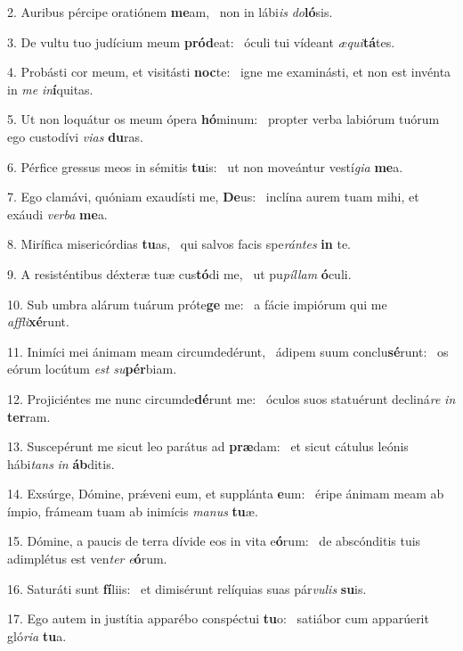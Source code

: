 2. Auribus pércipe oratiónem \textbf{me}am, \ast\  non in lábi\textit{is} \textit{do}\textbf{ló}sis.\

3. De vultu tuo judícium meum \textbf{pród}eat: \ast\  óculi tui vídeant \textit{æ}\textit{qui}\textbf{tá}tes.\

4. Probásti cor meum, et visitásti \textbf{noc}te: \ast\  igne me examinásti, et non est invénta in \textit{me} \textit{in}\textbf{í}quitas.\

5. Ut non loquátur os meum ópera \textbf{hó}minum: \ast\  propter verba labiórum tuórum ego custodívi \textit{vi}\textit{as} \textbf{du}ras.\

6. Pérfice gressus meos in sémitis \textbf{tu}is: \ast\  ut non moveántur vestí\textit{gi}\textit{a} \textbf{me}a.\

7. Ego clamávi, quóniam exaudísti me, \textbf{De}us: \ast\  inclína aurem tuam mihi, et exáudi \textit{ver}\textit{ba} \textbf{me}a.\

8. Mirífica misericórdias \textbf{tu}as, \ast\  qui salvos facis spe\textit{rán}\textit{tes} \textbf{in} te.\

9. A resisténtibus déxteræ tuæ cus\textbf{tó}di me, \ast\  ut pu\textit{píl}\textit{lam} \textbf{ó}culi.\

10. Sub umbra alárum tuárum próte\textbf{ge} me: \ast\  a fácie impiórum qui me \textit{af}\textit{fli}\textbf{xé}runt.\

11. Inimíci mei ánimam meam circumdedérunt, \dag\  ádipem suum conclu\textbf{sé}runt: \ast\  os eórum locútum \textit{est} \textit{su}\textbf{pér}biam.\

12. Projiciéntes me nunc circumde\textbf{dé}runt me: \ast\  óculos suos statuérunt decliná\textit{re} \textit{in} \textbf{ter}ram.\

13. Suscepérunt me sicut leo parátus ad \textbf{præ}dam: \ast\  et sicut cátulus leónis hábi\textit{tans} \textit{in} \textbf{áb}ditis.\

14. Exsúrge, Dómine, prǽveni eum, et supplánta \textbf{e}um: \ast\  éripe ánimam meam ab ímpio, frámeam tuam ab inimícis \textit{ma}\textit{nus} \textbf{tu}æ.\

15. Dómine, a paucis de terra dívide eos in vita e\textbf{ó}rum: \ast\  de abscónditis tuis adimplétus est ven\textit{ter} \textit{e}\textbf{ó}rum.\

16. Saturáti sunt \textbf{fí}liis: \ast\  et dimisérunt relíquias suas pár\textit{vu}\textit{lis} \textbf{su}is.\

17. Ego autem in justítia apparébo conspéctui \textbf{tu}o: \ast\  satiábor cum apparúerit gló\textit{ri}\textit{a} \textbf{tu}a.\

